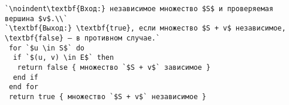 \begin{lstlisting}[escapechar=`]
`\noindent\textbf{Вход:} независимое множество $S$ и проверяемая вершина $v$.\\`
`\textbf{Выход:} \textbf{true}, если множество $S + v$ независимое, \textbf{false} — в противном случае.`
 for `$u \in S$` do
  if `$(u, v) \in E$` then
   return false { множество `$S + v$` зависимое }
  end if
 end for
 return true { множество `$S + v$` независимое }
\end{lstlisting}
